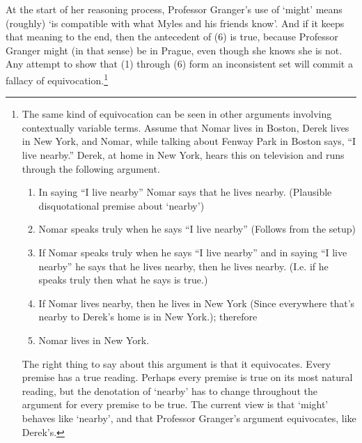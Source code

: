 \documentclass[
  10pt,
  letterpaper,
  DIV=11,
  numbers=noendperiod,
  twoside]{scrartcl}
\providecommand{\tightlist}{%
  \setlength{\itemsep}{0pt}\setlength{\parskip}{0pt}}\usepackage{longtable,booktabs,array}
\begin{document}
At the start of her reasoning process, Professor Granger's use of
`might' means (roughly) `is compatible with what Myles and his friends
know'. And if it keeps that meaning to the end, then the antecedent of
(6) is true, because Professor Granger might (in that sense) be in
Prague, even though she knows she is not. Any attempt to show that (1)
through (6) form an inconsistent set will commit a fallacy of
equivocation.\footnote{The same kind of equivocation can be seen in
  other arguments involving contextually variable terms. Assume that
  Nomar lives in Boston, Derek lives in New York, and Nomar, while
  talking about Fenway Park in Boston says, ``I live nearby.'' Derek, at
  home in New York, hears this on television and runs through the
  following argument.

  \begin{enumerate}
  \def\labelenumi{\arabic{enumi}.}
  \tightlist
  \item
    In saying ``I live nearby'' Nomar says that he lives nearby.
    (Plausible disquotational premise about `nearby')
  \item
    Nomar speaks truly when he says ``I live nearby'' (Follows from the
    setup)
  \item
    If Nomar speaks truly when he says ``I live nearby'' and in saying
    ``I live nearby'' he says that he lives nearby, then he lives
    nearby. (I.e. if he speaks truly then what he says is true.)
  \item
    If Nomar lives nearby, then he lives in New York (Since everywhere
    that's nearby to Derek's home is in New York.); therefore
  \item
    Nomar lives in New York.
  \end{enumerate}

  The right thing to say about this argument is that it equivocates.
  Every premise has a true reading. Perhaps every premise is true on its
  most natural reading, but the denotation of `nearby' has to change
  throughout the argument for every premise to be true. The current view
  is that `might' behaves like `nearby', and that Professor Granger's
  argument equivocates, like Derek's.}
\end{document}
